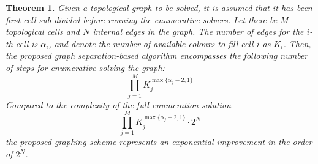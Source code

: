 \documentclass[journal]{IEEEtran}
\newtheorem{theorem}{Theorem}
\begin{document}
\begin{theorem}
Given a topological graph to be solved, it is assumed that it has been first cell sub-divided before running the enumerative solvers. Let there be $M$ topological cells and $N$ internal edges in the graph. The number of edges for the $i$-th cell is $\alpha_i$, and denote the number of available colours to fill cell $i$ as $K_i$. Then, the proposed graph separation-based algorithm encompasses the following number of steps for enumerative solving the graph:
\begin{equation}
\prod\limits_{j = 1}^M K_j^{\max\{\alpha_j-2, 1\}}
\end{equation}
Compared to the complexity of the full enumeration solution~\cite{Yang2020Cellular}
\begin{equation}
\prod\limits_{j = 1}^M K_j^{\max\{\alpha_j-2, 1\}}\cdot 2^N
\end{equation}
the proposed graphing scheme represents an exponential improvement in 
the order of $2^N$. 
\end{theorem}
\end{document}
